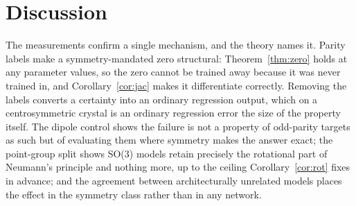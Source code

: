 \section*{Discussion}

The measurements confirm a single mechanism, and the theory names it. Parity labels make a symmetry-mandated zero structural: Theorem~\ref{thm:zero} holds at any parameter values, so the zero cannot be trained away because it was never trained in, and Corollary~\ref{cor:jac} makes it differentiate correctly. Removing the labels converts a certainty into an ordinary regression output, which on a centrosymmetric crystal is an ordinary regression error the size of the property itself. The dipole control shows the failure is not a property of odd-parity targets as such but of evaluating them where symmetry makes the answer exact; the point-group split shows SO(3) models retain precisely the rotational part of Neumann's principle and nothing more, up to the ceiling Corollary~\ref{cor:rot} fixes in advance; and the agreement between architecturally unrelated models places the effect in the symmetry class rather than in any network.

